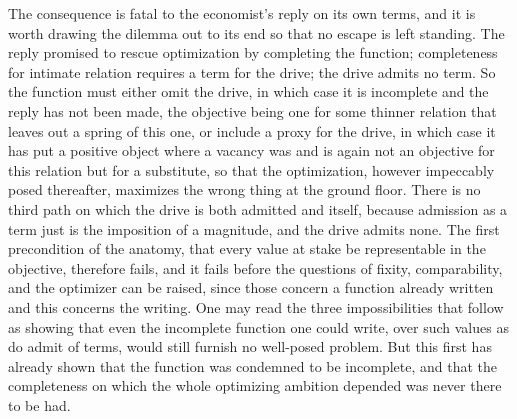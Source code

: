 The consequence is fatal to the economist's reply on its own terms, and it is worth drawing the dilemma out to its end so that no escape is left standing. The reply promised to rescue optimization by completing the function; completeness for intimate relation requires a term for the drive; the drive admits no term. So the function must either omit the drive, in which case it is incomplete and the reply has not been made, the objective being one for some thinner relation that leaves out a spring of this one, or include a proxy for the drive, in which case it has put a positive object where a vacancy was and is again not an objective for this relation but for a substitute, so that the optimization, however impeccably posed thereafter, maximizes the wrong thing at the ground floor. There is no third path on which the drive is both admitted and itself, because admission as a term just is the imposition of a magnitude, and the drive admits none. The first precondition of the anatomy, that every value at stake be representable in the objective, therefore fails, and it fails before the questions of fixity, comparability, and the optimizer can be raised, since those concern a function already written and this concerns the writing. One may read the three impossibilities that follow as showing that even the incomplete function one could write, over such values as do admit of terms, would still furnish no well-posed problem. But this first has already shown that the function was condemned to be incomplete, and that the completeness on which the whole optimizing ambition depended was never there to be had.
